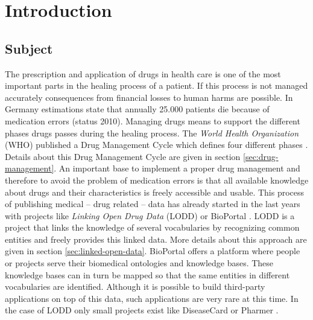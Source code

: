 \chapter{Introduction}
\label{cha:introduction-1}

\section{Subject}
\label{sec:subject}

The prescription and application of drugs in health care is one of the most important parts in the healing process of  a patient.
If this process is not managed accurately consequences from financial losses to  human harms are possible.
In Germany estimations state that annually 25.000 patients die because of medication errors \cite{pharzeit10} (status 2010).
Managing drugs means to support the different phases drugs passes during the healing process.
The \textit{World Health Organization} (WHO) published a Drug Management Cycle which defines four different phases \cite{who2004}.
Details about this Drug Management Cycle are given in section \ref{sec:drug-management}. 
An important base to implement a proper drug management and therefore to avoid the problem of medication errors is that all available knowledge about drugs and their characteristics is freely accessible and usable.
This process of publishing medical -- drug related -- data has already started in the last years with projects like \textit{Linking Open Drug Data} (LODD) \cite{jentzsch2009linking} or BioPortal \cite{whetzel2011bioportal}.
LODD is a project that links the knowledge of several vocabularies by recognizing common entities and freely provides this linked data.
More details about this approach are given in section \ref{sec:linked-open-data}.
BioPortal offers a platform where people or projects serve their biomedical ontologies and knowledge bases.
These knowledge bases can in turn be mapped so that the same entities in different vocabularies are identified.
Although it is possible to build third-party applications on top of this data, such applications are very rare at this time.
In the case of LODD only small projects exist like DiseaseCard \cite{oliveira2004diseasecard} or Pharmer \cite{khalili2013pharmer}.

